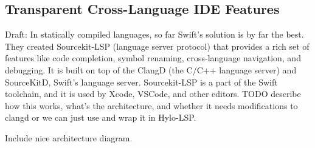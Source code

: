 \subsection{Transparent Cross-Language IDE Features}
Draft: In statically compiled languages, so far Swift's solution is by far the best. They created Sourcekit-LSP (language server protocol) that provides a rich set of features like code completion, symbol renaming, cross-language navigation, and debugging. It is built on top of the ClangD (the C/C++ language server) and SourceKitD, Swift's language server. Sourcekit-LSP is a part of the Swift toolchain, and it is used by Xcode, VSCode, and other editors. TODO describe how this works, what's the architecture, and whether it needs modifications to clangd or we can just use and wrap it in Hylo-LSP.

Include nice architecture diagram.





































